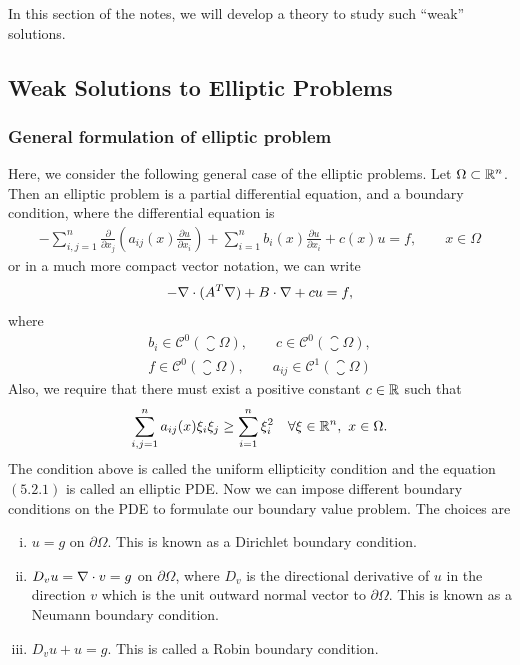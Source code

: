 \FloatBarrier
In this section of the notes, we will develop a theory to study such ``weak'' solutions.


\subsection{Weak Solutions to Elliptic Problems}

\subsubsection*{General formulation of elliptic problem}
Here, we consider the following general case of the elliptic problems. Let $ \Omega \subset \R^n $. Then an elliptic problem is a partial differential equation, and a boundary condition, where the differential equation is
\begin{align*}
	 -\sum_{i,j=1}^{n}\frac{\partial}{\partial x_j}(a_{ij}(x) \frac{\partial u}{\partial x_i}) + \sum_{i=1}^{n}b_i(x) \frac{\partial u}{\partial x_i} + c(x) u = f, \qquad x \in \Omega \tag{5.2.1}
\end{align*}
or in a much more compact vector notation, we can write
\[  -\div{(A^T \grad{u})} + B \cdot \grad{u} + c u = f,  \]
where
\begin{align*}
	b_i \in \mathscr{C}^0(\closure{\Omega}), \qquad c \in \mathscr{C}^0(\closure{\Omega}),\\
	f \in \mathscr{C}^0(\closure{\Omega}), \qquad a_{ij} \in \mathscr{C}^1(\closure{\Omega}) \tag{5.2.1.C}
\end{align*}
Also, we require that there must exist a positive constant $ c \in \R $ such that
\[ \sum_{i,j=1}^{n} a_{ij}(x) \xi_i \xi_j \geq \sum_{i=1}^{n}\xi_i^2 \quad \forall \xi \in \R^n,\ x \in \Omega. \]
The condition above is called the uniform ellipticity condition and the equation $ (5.2.1) $ is called an elliptic PDE. Now we can impose different boundary conditions on the PDE to formulate our boundary value problem. The choices are
\begin{enumerate}[(i)]	
	\item $ u = g $ on $ \partial \Omega $. This is known as a Dirichlet boundary condition.
	\item $ D_v u = \grad{u}\cdot v = g $ on $ \partial \Omega $, where $ D_v $ is the directional derivative of $ u $ in the direction $ v $ which is the unit outward normal vector to $ \partial \Omega $. This is known as a Neumann boundary condition. 
	\item $ D_v u + u = g $. This is called a Robin boundary condition.
\end{enumerate}

